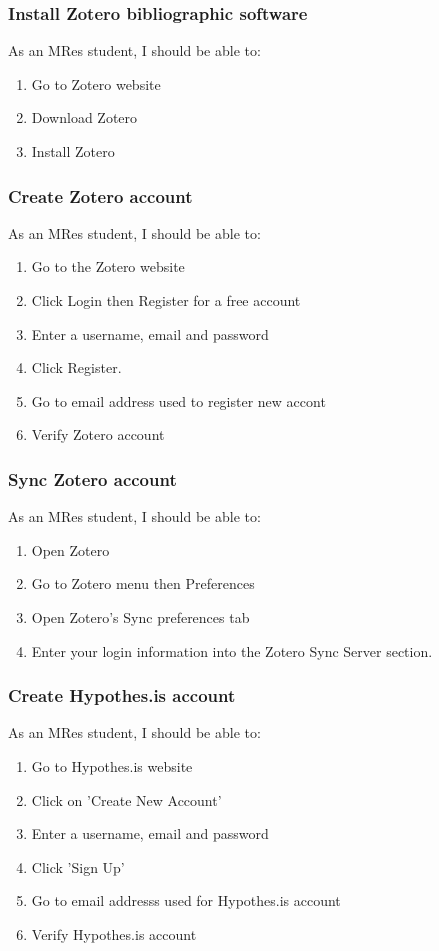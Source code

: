 \documentclass{article}
\begin{document}
\subsubsection*{Install Zotero bibliographic software}

As an MRes student, I should be able to:
\begin{enumerate}
\item Go to Zotero website
\item Download Zotero
\item Install Zotero
\end{enumerate}

\subsubsection*{Create Zotero account}

As an MRes student, I should be able to:
\begin{enumerate}
\item Go to the Zotero  website
\item Click Login then Register for a free account
\item Enter a username, email and password 
\item Click Register.
\item Go to email address used to register new accont
\item Verify Zotero account
\end{enumerate}

\subsubsection*{Sync Zotero account}

As an MRes student, I should be able to:
\begin{enumerate}
\item Open Zotero
\item Go to Zotero menu then Preferences
\item Open Zotero's Sync preferences tab 
\item Enter your login information into the Zotero Sync Server section.
\end{enumerate}

\subsubsection*{Create Hypothes.is account}

As an MRes student, I should be able to:
\begin{enumerate}
\item Go to Hypothes.is website
\item Click on 'Create New Account'
\item Enter a username, email and password
\item Click 'Sign Up'
\item Go to email addresss used for Hypothes.is account
\item Verify Hypothes.is account
\end{enumerate}
\end{document}
